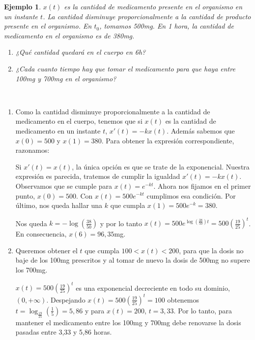 \documentclass[11pt]{article}
\makeatletter
\theoremstyle{theorem-style}  %
\renewenvironment{proof}[1][\proofname]{\par
	\pushQED{\qed}%
	\normalfont \topsep6\p@\@plus6\p@\relax
	\list{}{%
		\settowidth{\leftmargin}{\quad:\hskip\labelsep}%
		\setlength{\labelwidth}{0pt}%
		\setlength{\itemindent}{-\leftmargin}%
	}%
	\item[\hskip\labelsep\itshape#1\@addpunct{:}]\ignorespaces
}{%
	\popQED\endlist\@endpefalse
}
\theoremstyle{definition-style}
\theoremstyle{example-style}
\newtheorem{example}{Ejemplo}[section]
\makeatother
\begin{document}
\begin{example}
	$ x(t) $ es la cantidad de medicamento presente en el organismo en un instante $ t $. La cantidad disminuye proporcionalmente a la cantidad de producto presente en el organismo. En $ t_0 $, tomamos 500mg. En 1 hora, la cantidad de medicamento en el organismo es de 380mg.
	\begin{enumerate}[\qquad a)]
		\item ¿Qué cantidad quedará en el cuerpo en 6h?
		\item ¿Cada cuanto tiempo hay que tomar el medicamento para que haya entre 100mg y 700mg en el organismo? 
	\end{enumerate}
\end{example}
\begin{proof}[Solución] \ 
	\begin{enumerate}[\qquad a)]
		\item Como la cantidad disminuye proporcionalmente a la cantidad de medicamento en el cuerpo, tenemos que si $ x(t) $ es la cantidad de medicamento en un instante $ t $, $ x'(t)=-kx(t) $. Además sabemos que $ x(0)=500 $ y $ x(1)=380 $. Para obtener la expresión correspondiente, razonamos:

		Si $ x'(t)=x(t) $, la única opción es que se trate de la exponencial. Nuestra expresión es parecida, tratemos de cumplir la igualdad $ x'(t)=-kx(t) $. Observamos que se cumple para $ x(t)=e^{-kt} $. Ahora nos fijamos en el primer punto,  $ x(0)=500 $. Con  $ x(t)=500e^{-kt} $ cumplimos esa condición. Por último, nos queda hallar una $ k $ que cumpla $ x(1)=500e^{-k}=380 $. 
		
		Nos queda $ k=-\log(\frac{38}{50}) $ y por lo tanto $ x(t)=500e^{\log(\frac{38}{50})t} =500(\frac{19}{25})^t$. En consecuencia, $ x(6)=96,35 $mg.

		\item Queremos obtener el $ t $ que cumpla $ 100<x(t)<200 $, para que la dosis no baje de los 100mg prescritos y al tomar de nuevo la dosis de 500mg no supere los 700mg.

		$ x(t)=500(\frac{19}{25})^t$ es una exponencial decreciente en todo su dominio, $ (0, +\infty) $. Despejando $ x(t)=500(\frac{19}{25})^t=100$ obtenemos $ t=\log_{\frac{19}{25}}(\frac{1}{5})=5,86 $ y para $ x(t)=200 $, $ t=3,33 $. Por lo tanto, para mantener el medicamento entre los 100mg y 700mg debe renovarse la dosis pasadas entre 3,33 y 5,86 horas.
	\end{enumerate}
\end{proof}
\end{document}
